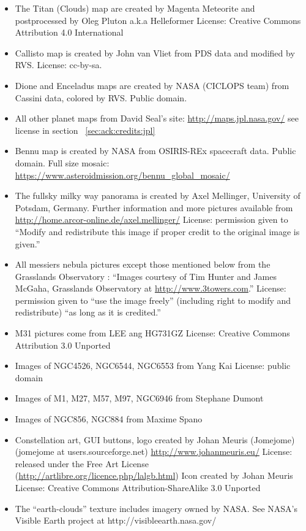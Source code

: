 \begin{itemize}
\item The Titan (Clouds) map are created by Magenta Meteorite and postprocessed
	 by Oleg Pluton a.k.a Helleformer
	 License: Creative Commons Attribution 4.0 International
\item Callisto map is created by John van Vliet from PDS
	 data and modified by RVS. License: cc-by-sa.
\item Dione and Enceladus maps are created by NASA (CICLOPS team) 
	 from Cassini data, colored by RVS. Public domain.
\item All other planet maps from David Seal's site:
	 \url{http://maps.jpl.nasa.gov/} see license in section ~\ref{sec:ack:credits:jpl}
\item Bennu map is created by NASA from OSIRIS-REx spacecraft data. Public domain.
	 Full size mosaic: \url{https://www.asteroidmission.org/bennu_global_mosaic/}
\item The fullsky milky way panorama is created by Axel Mellinger,
	 University of Potsdam, Germany. Further information and more
	 pictures available from
	 \url{http://home.arcor-online.de/axel.mellinger/}
	 License: permission given to ``Modify and redistribute this image
	 if proper credit to the original image is given.''
\item All messiers nebula pictures except those mentioned below from the
	 Grasslands Observatory : ``Images courtesy of Tim Hunter and
	 James McGaha, Grasslands Observatory at \url{http://www.3towers.com}.''
	 License: permission given to ``use the image freely'' (including
	 right to modify and redistribute) ``as long as it is credited.''
\item M31 pictures come from LEE ang HG731GZ
	 License: Creative Commons Attribution 3.0 Unported
\item Images of NGC4526, NGC6544, NGC6553
	 from Yang Kai
	 License: public domain 
\item Images of M1, M27, M57, M97, NGC6946 from Stephane
	 Dumont
\item Images of NGC856, NGC884 from Maxime Spano
\item Constellation art, GUI buttons, logo created by Johan Meuris
	 (Jomejome) (jomejome at users.sourceforge.net)
	 \url{http://www.johanmeuris.eu/}
	 License: released under the Free Art License
	 (\url{http://artlibre.org/licence.php/lalgb.html})
	 Icon created by Johan Meuris
	 License: Creative Commons Attribution-ShareAlike 3.0 Unported
\item The ``earth-clouds'' texture includes imagery owned by NASA.
	 See NASA's Visible Earth project at http://visibleearth.nasa.gov/

\end{itemize}
